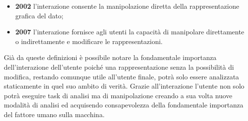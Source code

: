 {\begin{itemize}
	\item \textbf{2002} l’interazione consente la manipolazione diretta della rappresentazione grafica del dato;
	\item \textbf{2007} l’interazione fornisce agli utenti la capacità di manipolare direttamente o indirettamente e modificare le rappresentazioni.
\end{itemize}
Già da queste definizioni è possibile notare la fondamentale importanza dell'interazione dell'utente poiché una rappresentazione senza la possibilità di modifica, restando comunque utile all'utente finale, potrà solo essere analizzata staticamente in quel suo ambito di verità. Grazie all'interazione l'utente non solo potrà eseguire task di analisi ma di manipolazione creando a sua volta nuove modalità di analisi ed acquisendo consapevolezza della fondamentale importanza del fattore umano sulla macchina.

}
